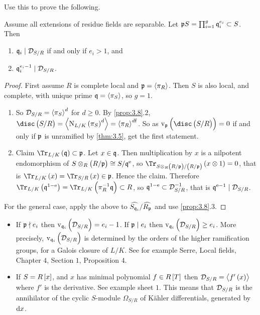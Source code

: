 \pagebreak

Use this to prove the following.

\begin{theorem}
Assume all extensions of residue fields are separable. Let $ \mathfrak{p} S = \prod_{i = 1}^g \mathfrak{q}_i^{e_i} \subset S $. Then
\begin{enumerate}
\item $ \mathfrak{q}_i \mid \mathcal{D}_{S / R} $ if and only if $ e_i > 1 $, and
\item $ \mathfrak{q}_i^{e_i - 1} \mid \mathcal{D}_{S / R} $.
\end{enumerate}
\end{theorem}

\begin{proof}
First assume $ R $ is complete local and $ \mathfrak{p} = \left\langle \pi_R \right\rangle $. Then $ S $ is also local, and complete, with unique prime $ \mathfrak{q} = \left\langle \pi_S \right\rangle $, so $ g = 1 $.
\begin{enumerate}
\item So $ \mathcal{D}_{S / R} = \left\langle \pi_S \right\rangle^d $ for $ d \ge 0 $. By \ref{prop:3.8}.$ 2 $, $ \disc\br{S / R} = \abr{\N_{L / K}\br{\pi_S}^d} = \abr{\pi_R}^{d\f} $. So as $ \v_\ppp\br{\disc\br{S / R}} = 0 $ if and only if $ \mathfrak{p} $ is unramified by \ref{thm:3.5}, get the first statement.
\item Claim $ \Tr_{L / K}\br{\qqq} \subset \ppp $. Let $ x \in \mathfrak{q} $. Then multiplication by $ x $ is a nilpotent endomorphism of $ S \otimes_R \br{R / \ppp} \cong S / \qqq^\e $, so $ \Tr_{S \otimes_R \br{R / \ppp} / \br{R / \ppp}}\br{x \otimes 1} = 0 $, that is $ \Tr_{L / K}\br{x} = \Tr_{S / R}\br{x} \in \ppp $. Hence the claim. Therefore $ \Tr_{L / K}\br{\qqq^{1 - \e}} = \Tr_{L / K}\br{\pi_R^{-1}\qqq} \subset R $, so $ \mathfrak{q}^{1 - \mathrm{e}} \subset \mathcal{D}_{S / R}^{-1} $, that is $ \mathfrak{q}^{\mathrm{e} - 1} \mid \mathcal{D}_{S / R} $.
\end{enumerate}
For the general case, apply the above to $ \widehat{S_{\mathfrak{q}_i}} / \widehat{R_{\mathfrak{p}}} $ and use \ref{prop:3.8}.$ 3 $.
\end{proof}

\begin{fact*}
\hfill
\begin{itemize}
\item If $ \mathfrak{p} \nmid e_i $ then $ \v_{\qqq_i}\br{\DDD_{S / R}} = e_i - 1 $. If $ \mathfrak{p} \mid e_i $ then $ \v_{\qqq_i}\br{\DDD_{S / R}} \ge e_i $. More precisely, $ \v_{\qqq_i}\br{\DDD_{S / R}} $ is determined by the orders of the higher ramification groups, for a Galois closure of $ L / K $. See for example Serre, Local fields, Chapter $ 4 $, Section $ 1 $, Proposition $ 4 $.
\item If $ S = R\sbr{x} $, and $ x $ has minimal polynomial $ f \in R\sbr{T} $ then $ \DDD_{S / R} = \abr{f'\br{x}} $ where $ f' $ is the derivative. See example sheet $ 1 $. This means that $ \mathcal{D}_{S / R} $ is the annihilator of the cyclic $ S $-module $ \Omega_{S / R} $ of K\"ahler differentials, generated by $ \mathrm{d} x $.
\end{itemize}
\end{fact*}

